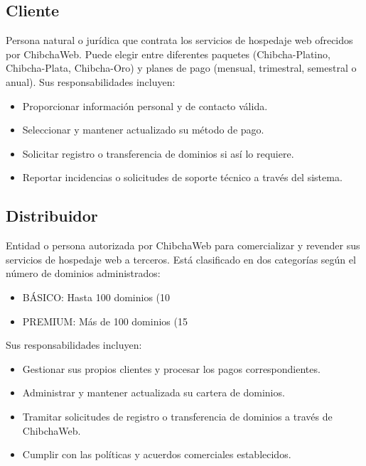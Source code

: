 \subsection{Cliente}
Persona natural o jurídica que contrata los servicios de hospedaje web ofrecidos por ChibchaWeb.
Puede elegir entre diferentes paquetes (Chibcha-Platino, Chibcha-Plata, Chibcha-Oro) y planes de pago (mensual, trimestral, semestral o anual).
Sus responsabilidades incluyen:

\begin{itemize}
\item Proporcionar información personal y de contacto válida.

\item Seleccionar y mantener actualizado su método de pago.

\item Solicitar registro o transferencia de dominios si así lo requiere.

\item Reportar incidencias o solicitudes de soporte técnico a través del sistema.
\end{itemize}

\subsection{Distribuidor}

Entidad o persona autorizada por ChibchaWeb para comercializar y revender sus servicios de hospedaje web a terceros.
Está clasificado en dos categorías según el número de dominios administrados:

\begin{itemize}
    \item BÁSICO: Hasta 100 dominios (10%
    \item PREMIUM: Más de 100 dominios (15%
\end{itemize}

Sus responsabilidades incluyen:

\begin{itemize}
    \item Gestionar sus propios clientes y procesar los pagos correspondientes.
    \item Administrar y mantener actualizada su cartera de dominios.
    \item Tramitar solicitudes de registro o transferencia de dominios a través de ChibchaWeb.
    \item Cumplir con las políticas y acuerdos comerciales establecidos.
\end{itemize}
